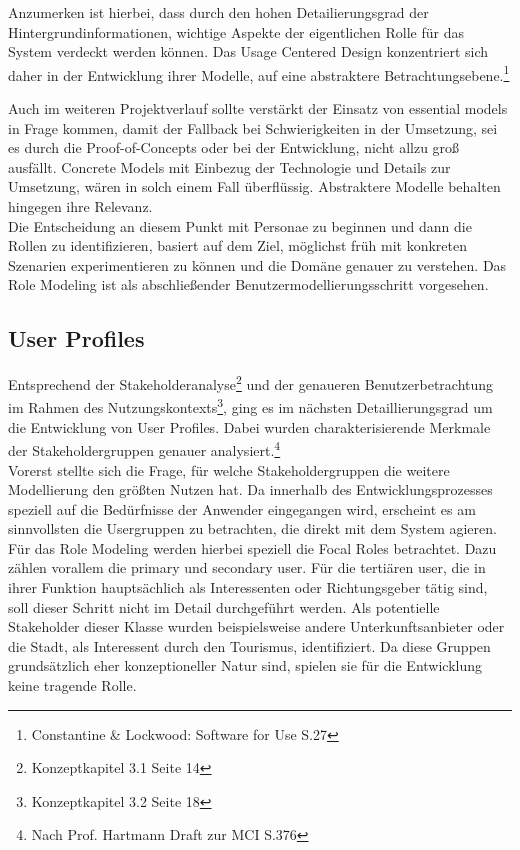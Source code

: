 Anzumerken ist hierbei, dass durch den hohen Detailierungsgrad der Hintergrundinformationen, wichtige Aspekte der eigentlichen Rolle für das System verdeckt werden können. Das Usage Centered Design konzentriert sich daher in der Entwicklung ihrer Modelle, auf eine abstraktere Betrachtungsebene.\footnote{Constantine \& Lockwood: Software for Use S.27} 

\newpage
Auch im weiteren Projektverlauf sollte verstärkt der Einsatz von essential models in Frage kommen, damit der Fallback bei Schwierigkeiten in der Umsetzung, sei es durch die Proof-of-Concepts oder bei der Entwicklung, nicht allzu groß ausfällt. Concrete Models mit Einbezug der Technologie und Details zur Umsetzung, wären in solch einem Fall überflüssig. Abstraktere Modelle behalten hingegen ihre Relevanz.\\

Die Entscheidung an diesem Punkt mit Personae zu beginnen und dann die Rollen zu identifizieren, basiert auf dem Ziel, möglichst früh mit konkreten Szenarien experimentieren zu können und die Domäne genauer zu verstehen. Das Role Modeling ist als abschließender Benutzermodellierungsschritt vorgesehen.


\subsection{User Profiles}
Entsprechend der Stakeholderanalyse\footnote{Konzeptkapitel 3.1 Seite 14} und der genaueren Benutzerbetrachtung im Rahmen des Nutzungskontexts\footnote{Konzeptkapitel 3.2 Seite 18}, ging es im nächsten Detaillierungsgrad um die Entwicklung von User Profiles. Dabei wurden charakterisierende Merkmale der Stakeholdergruppen genauer analysiert.\footnote{Nach Prof. Hartmann Draft zur MCI S.376}\\
Vorerst stellte sich die Frage, für welche Stakeholdergruppen die weitere Modellierung den größten Nutzen hat. Da innerhalb des Entwicklungsprozesses speziell auf die Bedürfnisse der Anwender eingegangen wird, erscheint es am sinnvollsten die Usergruppen zu betrachten, die direkt mit dem System agieren. Für das Role Modeling werden hierbei speziell die Focal Roles betrachtet. Dazu zählen vorallem die primary und secondary user. Für die tertiären user, die in ihrer Funktion hauptsächlich als Interessenten oder Richtungsgeber tätig sind, soll dieser Schritt nicht im Detail durchgeführt werden. Als potentielle Stakeholder dieser Klasse wurden beispielsweise andere Unterkunftsanbieter oder die Stadt, als Interessent durch den Tourismus, identifiziert. Da diese Gruppen grundsätzlich eher konzeptioneller Natur sind, spielen sie für die Entwicklung keine tragende Rolle.\\

